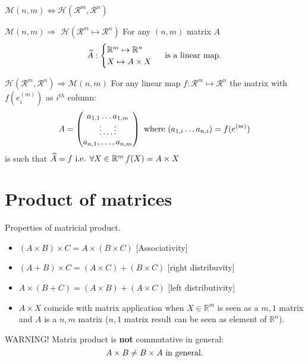 \documentclass{beamer}
\begin{document}
\begin{frame}{$\mathcal{M}(n,m) \Leftrightarrow \mathcal{H}(\mathcal{R}^m, \mathcal{R}^n)$}
  \begin{block}{$\mathcal{M}(n,m) \Rightarrow$ $\mathcal{H}(\mathcal{R}^m \mapsto \mathcal{R}^n)$}
    For any $(n,m)$ matrix $A$ \[\widehat A: \begin{cases} \mathbb{R}^m \mapsto \mathbb{R}^n\\ X \mapsto A \times X \end{cases} \textnormal{ is a linear map.}\]
  \end{block}

  \begin{block}{$\mathcal{H}(\mathcal{R}^m, \mathcal{R}^n) \Rightarrow \mathcal{M}(n,m)$}
    For any linear map $f: \mathcal{R}^m \mapsto \mathcal{R}^n$ the matrix with $f(e^{(m)}_i)$ as $i^{th}$ column:
    \[ A = \begin{pmatrix} a_{1,1} \dots a_{1,m} \\ \vdots \dots \vdots \\ a_{n,1}, \dots, a_{n,m}  \end{pmatrix}  \textnormal{ where } (a_{1,i} \dots a_{n,i}) = f(e^{(m)}) \]
    is such that $\widehat A = f \textnormal{ i.e. } \forall X \in \mathbb{R}^{m}\,f(X) = A \times X$
  \end{block}
\end{frame}


\section{Product of matrices}

\begin{frame}{Properties of matricial product.}
  \begin{itemize}
  \item $(A \times B) \times C = A \times (B \times C)$ [Associativity]
  \item $(A + B) \times C = (A \times C) + (B \times C)$ [right distribuvity]
  \item $A \times (B + C) = (A \times B) + (A \times C)$ [left distributivity]
  \item $A \times X$ coincide with matrix application when $X \in \mathbb{R}^m$ is seen as a $m, 1$ matrix and $A$ is a $n,m$ matrix ($n,1$ matrix result can be seen as element of $\mathbb{R}^n$).
  \end{itemize}

  \begin{alertblock}{WARNING!}
    Matrix product is {\bf not} commutative in general:
    \[ A \times B \neq B \times A \textnormal{ in general.}\] 
  \end{alertblock}
\end{frame}
\end{document}

